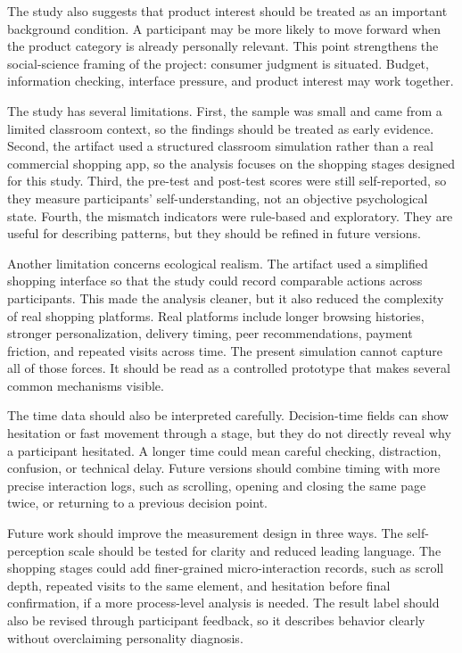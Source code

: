 \documentclass[stu,12pt,floatsintext]{apa7}
\begin{document}
The study also suggests that product interest should be treated as an important background condition. A participant may be more likely to move forward when the product category is already personally relevant. This point strengthens the social-science framing of the project: consumer judgment is situated. Budget, information checking, interface pressure, and product interest may work together.

The study has several limitations. First, the sample was small and came from a limited classroom context, so the findings should be treated as early evidence. Second, the artifact used a structured classroom simulation rather than a real commercial shopping app, so the analysis focuses on the shopping stages designed for this study. Third, the pre-test and post-test scores were still self-reported, so they measure participants' self-understanding, not an objective psychological state. Fourth, the mismatch indicators were rule-based and exploratory. They are useful for describing patterns, but they should be refined in future versions.

Another limitation concerns ecological realism. The artifact used a simplified shopping interface so that the study could record comparable actions across participants. This made the analysis cleaner, but it also reduced the complexity of real shopping platforms. Real platforms include longer browsing histories, stronger personalization, delivery timing, peer recommendations, payment friction, and repeated visits across time. The present simulation cannot capture all of those forces. It should be read as a controlled prototype that makes several common mechanisms visible.

The time data should also be interpreted carefully. Decision-time fields can show hesitation or fast movement through a stage, but they do not directly reveal why a participant hesitated. A longer time could mean careful checking, distraction, confusion, or technical delay. Future versions should combine timing with more precise interaction logs, such as scrolling, opening and closing the same page twice, or returning to a previous decision point.

Future work should improve the measurement design in three ways. The self-perception scale should be tested for clarity and reduced leading language. The shopping stages could add finer-grained micro-interaction records, such as scroll depth, repeated visits to the same element, and hesitation before final confirmation, if a more process-level analysis is needed. The result label should also be revised through participant feedback, so it describes behavior clearly without overclaiming personality diagnosis.
\end{document}
